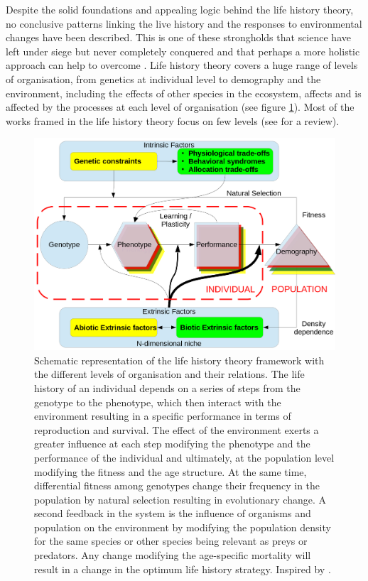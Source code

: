 Despite the solid foundations and appealing logic behind the life history
theory, no conclusive patterns linking the live history and the responses to
environmental changes have been described. This is one of these strongholds
that science have left under siege but never completely conquered and that
perhaps a more holistic approach can help to overcome
\citep[p.~269--274]{levins1985}.
Life history theory covers a huge range of levels of organisation, from genetics
at individual level to demography and the environment, including the effects of
other species in the ecosystem, affects and is affected by the processes at
each level of organisation (see figure \ref{fig:fig1.1}). Most of the works
framed in the life history theory focus on few levels (see \citet{Stearns2000}
for a review).


\begin{figure}
\centering
\includegraphics[width=\textwidth]{./Figures/intro/esquemaLH.png}
\caption[LH schema]{
Schematic representation of the life history theory framework with the
different levels of organisation and their relations.
The life history of an individual depends on a series of steps from the
genotype to the phenotype, which then interact with the environment resulting
in a specific performance in terms of reproduction and survival. The effect of
the environment exerts a greater influence at each step modifying the phenotype
and the performance of the individual and ultimately, at the population level
modifying the fitness and the age structure.
At the same time, differential fitness among genotypes change their frequency
in the population by natural selection resulting in evolutionary change. A
second feedback in the system is the influence of organisms and population
on the environment by modifying the population density for the same
species or other species being relevant as preys or predators. Any change
modifying the age-specific mortality will result in a change in the optimum
life history strategy. Inspired by \citet{Ricklefs2002}.
}
\label{fig:fig1.1}
\end{figure}


